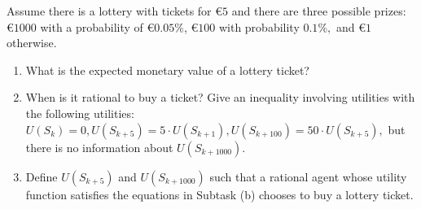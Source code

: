 Assume there is a lottery with tickets for €$5$ and there are three possible prizes: €$1000$ with a probability of €$0.05\%$, €$100$ with probability $0.1\%,$ and €$1$ otherwise.

\begin{enumerate}[label=(\alph*)]
    \item What is the expected monetary value of a lottery ticket?
    \item  When is it rational to buy a ticket? Give an inequality involving utilities with the following utilities: $U(S_k) = 0, U(S_{k+5} ) = 5 \cdot U(S_{k+1} ), U(S_{k+100}) = 50 \cdot U(S_{k+5}),$ but there is no information about $U(S_{k+1000})$.
    \item  Define $U(S_{k+5})$ and $U(S_{k+1000})$ such that a rational agent whose utility function satisfies the equations in Subtask (b) chooses to buy a lottery ticket.
\end{enumerate}